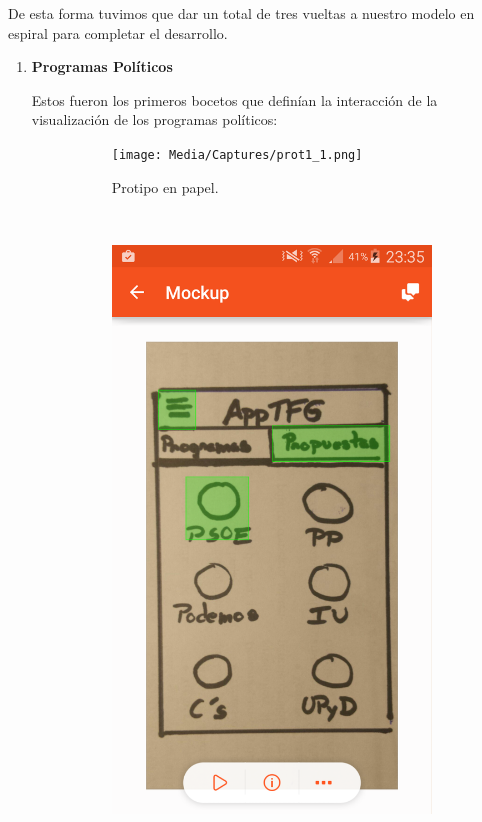 De esta forma tuvimos que dar un total de tres vueltas a nuestro modelo en espiral para completar el desarrollo.

\begin{enumerate}
 \item \textbf{Programas Políticos}
 
 Estos fueron los primeros bocetos que definían la interacción de la visualización de los programas políticos:
 
 	\begin{figure}[H]
        \centering
        \begin{subfigure}[b]{0.3\textwidth}
                \texttt{[image: Media/Captures/prot1\_1.png]}
                \caption{Protipo en papel.}
                \label{fig:quipDesktop}
        \end{subfigure}
        ~
        \begin{subfigure}[b]{0.3\textwidth}
                \includegraphics[width=\textwidth]{Media/Captures/prot1_2.png}

\end{subfigure}
\end{figure}
\end{enumerate}

